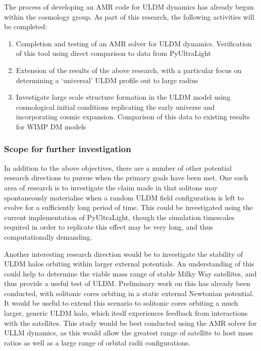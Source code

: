 The process of developing an AMR code for ULDM dynamics has already begun within the cosmology group. As part of this research, the following activities will be completed:

\begin{enumerate}
    \item Completion and testing of an AMR solver for ULDM dynamics. Verification of this tool using direct comparison to data from PyUltraLight
    \item Extension of the results of the above research, with a particular focus on determining a `universal' ULDM profile out to large radius
    \item Investigate large scale structure formation in the ULDM model using cosmological initial conditions replicating the early universe and incorporating cosmic expansion. Comparison of this data to existing results for WIMP DM models
\end{enumerate}


\subsubsection{Scope for further investigation}\label{additional}

In addition to the above objectives, there are a number of other potential research directions to pursue when the primary goals have been met. One such area of research is to investigate the claim made in \cite{Levkov:2018kau} that solitons may spontaneously materialise when a random ULDM field configuration is left to evolve for a sufficiently long period of time. This could be investigated using the current implementation of PyUltraLight, though the simulation timescales required in order to replicate this effect may be very long, and thus computationally demanding. 

Another interesting research direction would be to investigate the stability of ULDM halos orbiting within larger external potentials. An understanding of this could help to determine the viable mass range of stable Milky Way satellites, and thus provide a useful test of ULDM. Preliminary work on this has already been conducted, with solitonic cores orbiting in a static external Newtonian potential. It would be useful to extend this scenario to solitonic cores orbiting a much larger, generic ULDM halo, which iteslf experiences feedback from interactions with the satellites. This study would be best conducted using the AMR solver for ULLM dynamics, as this would allow the greatest range of satellite to host mass ratios as well as a large range of orbital radii configurations. 

